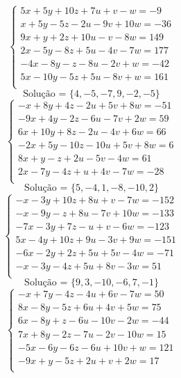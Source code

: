 \documentclass[12pt,oneside,a4paper]{article}
\begin{document}
\vspace{\baselineskip}
\begin{equation*}
\begin{cases}
5x+5y+10z+7u+v-w=-9 \\
x+5y-5z-2u-9v+10w=-36 \\
9x+y+2z+10u-v-8w=149 \\
2x-5y-8z+5u-4v-7w=177 \\
-4x-8y-z-8u-2v+w=-42 \\
5x-10y-5z+5u-8v+w=161 \\
\end{cases}
\end{equation*}
\begin{equation*}
\text{Solução = }\{4,-5,-7,9,-2,-5\}
\end{equation*}
\vspace{\baselineskip}
\begin{equation*}
\begin{cases}
-x+8y+4z-2u+5v+8w=-51 \\
-9x+4y-2z-6u-7v+2w=59 \\
6x+10y+8z-2u-4v+6w=66 \\
-2x+5y-10z-10u+5v+8w=6 \\
8x+y-z+2u-5v-4w=61 \\
2x-7y-4z+u+4v-7w=-28 \\
\end{cases}
\end{equation*}
\begin{equation*}
\text{Solução = }\{5,-4,1,-8,-10,2\}
\end{equation*}
\vspace{\baselineskip}
\begin{equation*}
\begin{cases}
-x-3y+10z+8u+v-7w=-152 \\
-x-9y-z+8u-7v+10w=-133 \\
-7x-3y+7z-u+v-6w=-123 \\
5x-4y+10z+9u-3v+9w=-151 \\
-6x-2y+2z+5u+5v-4w=-71 \\
-x-3y-4z+5u+8v-3w=51 \\
\end{cases}
\end{equation*}
\begin{equation*}
\text{Solução = }\{9,3,-10,-6,7,-1\}
\end{equation*}
\vspace{\baselineskip}
\begin{equation*}
\begin{cases}
-x+7y-4z-4u+6v-7w=50 \\
8x-8y-5z+6u+4v+5w=75 \\
6x-8y+z-6u-10v-2w=-44 \\
7x+8y-2z-7u-2v-10w=15 \\
-5x-6y-6z-6u+10v+w=121 \\
-9x+y-5z+2u+v+2w=17 \\
\end{cases}
\end{equation*}
\end{document}
